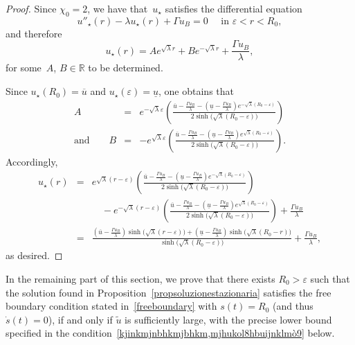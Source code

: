 \documentclass[12pt,a4paper,intlimits,sumlimits]{amsart}
\def \R {\mathbb{R}}
\theoremstyle{definition}
\theoremstyle{plain}
\numberwithin{equation}{section}
\begin{document}
\begin{proof}
Since $\chi_0=2$,
we have that~$u_\star$ satisfies the differential equation
\[
u''_\star(r)-\lambda u_\star(r)+\Gamma u_B=0 \quad\mbox{ in } \varepsilon<r<R_0,
\]
and therefore
\[
u_\star(r) = A e^{\sqrt{\lambda}r} + B e^{-\sqrt{\lambda}r} +\frac{\Gamma u_B}{\lambda},
\]
for some~$A$, $B\in\R$ to be determined. 

Since $u_\star(R_0)=\overline{u}$ and $u_\star(\varepsilon)=\underline{u}$, one obtains that
\begin{eqnarray*}
A&=&e^{-\sqrt{\lambda}\varepsilon}
\left(\frac{\overline{u} -\frac{\Gamma u_B}{\lambda}
-\left(\underline{u}-\frac{\Gamma u_B}{\lambda}\right) e^{-\sqrt{\lambda}(R_0-\varepsilon)}}{2\sinh\big(\sqrt{\lambda}(R_0-\varepsilon)\big)}\right)
\\{\mbox{and}} \qquad B&=& -e^{\sqrt{\lambda}\varepsilon}\left(
\frac{\overline{u} -\frac{\Gamma u_B}{\lambda}
-\left(\underline{u}-\frac{\Gamma u_B}{\lambda}\right)e^{\sqrt{\lambda}(R_0-\varepsilon)}}{2\sinh\big(\sqrt{\lambda}(R_0-\varepsilon)\big)}\right).
\end{eqnarray*}
Accordingly,  
\begin{eqnarray*}
u_\star(r)& =&  e^{\sqrt{\lambda}(r-\varepsilon)}
\left(\frac{\overline{u} -\frac{\Gamma u_B}{\lambda}
-\left(\underline{u}-\frac{\Gamma u_B}{\lambda}\right) e^{-\sqrt{\lambda}(R_0-\varepsilon)}}{2\sinh\big(\sqrt{\lambda}(R_0-\varepsilon)\big)}\right)
\\&&\quad-e^{-\sqrt{\lambda}(r-\varepsilon)}\left(
\frac{\overline{u} -\frac{\Gamma u_B}{\lambda}
-\left(\underline{u}-\frac{\Gamma u_B}{\lambda}\right)e^{\sqrt{\lambda}(R_0-\varepsilon)}}{2\sinh\big(\sqrt{\lambda}(R_0-\varepsilon)\big)}\right)
+\frac{\Gamma u_B}{\lambda}
\\&=&\frac{\left(\overline{u}-\frac{\Gamma u_B}{\lambda}\right)
\sinh\big(\sqrt{\lambda}(r-\varepsilon)\big)
+\left(\underline{u}-\frac{\Gamma u_B}{\lambda}\right)
\sinh\big(\sqrt{\lambda}(R_0-r)\big)}{\sinh\big(\sqrt{\lambda}(R_0-\varepsilon)\big)}
+\frac{\Gamma u_B}{\lambda},
\end{eqnarray*}
as desired.
\end{proof}

In the remaining part of this section, we prove that there exists $R_0>\varepsilon$ such that the solution found in Proposition~\ref{propsoluzionestazionaria} satisfies the free boundary condition stated in~\eqref{freeboundary} with $s(t)=R_0$ (and thus $\dot s(t)=0$), if and only if $\widetilde u$ is sufficiently large, with the precise lower bound specified in the condition~\eqref{kjinkmjnbhkmjbhkm,mjhukol8hbuijnklmò9} below. 
\end{document}
